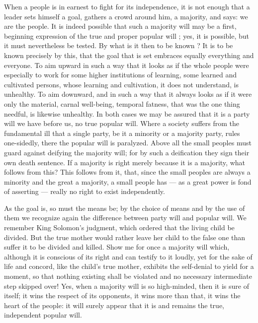 \documentclass[12pt,a4paper,openany]{book}
\newcommand{\opage}[1]{\marginnote{\footnotesize\textit{[#1]}}}
\begin{document}
When a people is in earnest to fight for its independence,
it is not enough that a leader sets himself
a goal, gathers a crowd around him, a majority, and
says: we are the people. It is indeed possible that such a
majority will may be a first, beginning expression
of the true and proper popular will ; yes, it is possible,
but it must nevertheless be tested. By what is it then to be known ?
It is to be known precisely by this, that the goal that is
set embraces equally everything and everyone. To aim upward in such a way
that it looks as if the whole people were especially to
work for some higher institutions of learning, some
learned and cultivated persons, whose learning and cultivation, it does not
\setcounter{footnote}{0}%
\opage{162}understand, is unhealthy. To aim downward, and in such a way
that it always looks as if it were only the material,
carnal well-being, temporal fatness, that was
the one thing needful, is likewise unhealthy. In both cases we may
be assured that it is a party will we have
before us, no true popular will. Where a society suffers
from the fundamental ill that a single party, be it a
minority or a majority party, rules one-sidedly, there
the popular will is paralyzed. Above all the small peoples must
guard against deifying the majority will; for by such
a deification they sign their own death sentence.
If a majority is right merely because it is a majority, what
follows from this? This follows from it, that, since the
small peoples are always a minority and the great a majority,
a small people has --- as a great power is fond of asserting
--- really no right to exist independently.


As the goal is, so must the means be; by the
choice of means and by the use of them we recognize again
the difference between party will and popular will. We remember
King Solomon's judgment, which ordered that the living child
be divided. But the true mother would rather leave
her child to the false one than suffer it to be
divided and killed. Show me for once a majority will which,
although it is conscious of its right and can testify to it
loudly, yet for the sake of life and concord, like the child's
true mother, exhibits the self-denial to yield
for a moment, so that nothing existing shall be violated
and no necessary intermediate step skipped over! Yes, when
a majority will is so high-minded, then it is sure
of itself; it wins the respect of its opponents, it
wins more than that, it wins the heart of the people: it
\setcounter{footnote}{0}%
\opage{163}will surely appear that it is and remains the true, independent
popular will.
\end{document}
